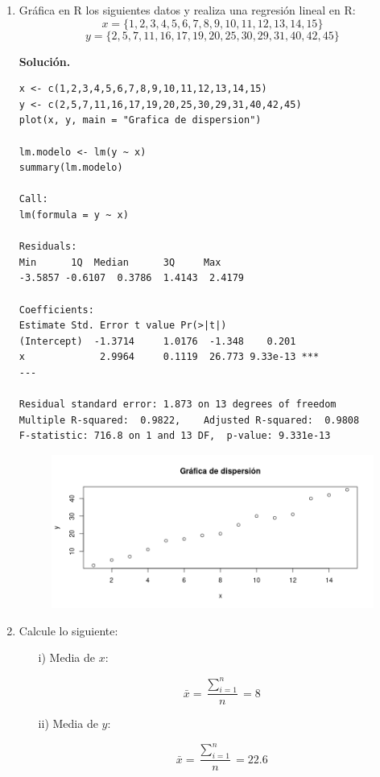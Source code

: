 \documentclass[11pt]{article}
\begin{document}
	\begin{enumerate}
		\item Gráfica en R los siguientes datos y realiza una regresión lineal en R:
		$$ x = \{1,2,3,4,5,6,7,8,9,10,11,12,13,14,15\}$$
		$$ y = \{2, 5, 7, 11, 16, 17, 19, 20, 25, 30, 29, 31, 40, 42, 45 \}$$ 
		
		\textbf{Solución.}
		\begin{lstlisting}
x <- c(1,2,3,4,5,6,7,8,9,10,11,12,13,14,15)
y <- c(2,5,7,11,16,17,19,20,25,30,29,31,40,42,45)
plot(x, y, main = "Grafica de dispersion")

lm.modelo <- lm(y ~ x)
summary(lm.modelo)

Call:
lm(formula = y ~ x)

Residuals:
Min      1Q  Median      3Q     Max 
-3.5857 -0.6107  0.3786  1.4143  2.4179 

Coefficients:
Estimate Std. Error t value Pr(>|t|)    
(Intercept)  -1.3714     1.0176  -1.348    0.201    
x             2.9964     0.1119  26.773 9.33e-13 ***
---

Residual standard error: 1.873 on 13 degrees of freedom
Multiple R-squared:  0.9822,	Adjusted R-squared:  0.9808 
F-statistic: 716.8 on 1 and 13 DF,  p-value: 9.331e-13
		\end{lstlisting}
	
		\begin{figure}[h!]
		\centering
		\includegraphics[width=1\textwidth]{image1}
		\end{figure}
	
		\item Calcule lo siguiente: 
		\begin{itemize}
			\item[i)] Media de $x$:
		\begin{tcolorbox}
		$$\bar{x} = \frac{\sum_{i=1}^{n}}{n} = 8$$
		\end{tcolorbox}
			\item[ii)] Media de $y$:
		\begin{tcolorbox}
			$$\bar{x} = \frac{\sum_{i=1}^{n}}{n} = 22.6$$
		\end{tcolorbox}
		\end{itemize}
		
	\end{enumerate}
\end{document}
